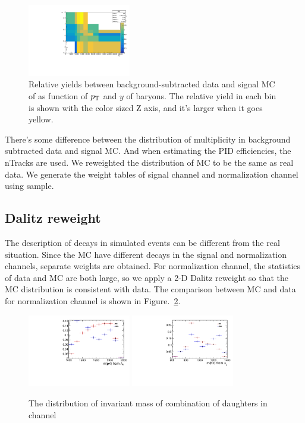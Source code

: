 \begin{figure}[bth]
\centering
\includegraphics[width=0.4\textwidth]{Figures/05_open_charm/04_tune/pt_y/ratio_pty.pdf}%
	\caption{ Relative yields between background-subtracted data and signal MC of \LbLcpi as function of $p_{\mathrm{T}}$ and $y$ of \Lb baryons. 
	The relative yield in each bin is shown with the color sized Z axis, and it's larger when it goes yellow.}
\label{Fig.pt_y_ratio}
\end{figure}

There's some difference between the distribution of multiplicity in background subtracted data and signal MC. 
And when estimating the PID efficiencies, the nTracks are used. 
We reweighted the distribution of MC to be the same as real data. 
We generate the weight tables of signal channel and normalization channel using \LbLcDs sample. 

\subsection{\Lc Dalitz reweight}
\label{sec:getdalitzweight}

The description of \Lc decays in simulated events can be different from the real situation. 
Since the MC have different \Lc decays in the signal and normalization channels, 
separate weights are obtained. 
For normalization channel, 
the statistics of data and MC are both large, 
so we apply a 2-D Dalitz reweight so that the MC distribution is consistent with data. 
The comparison between MC and data for normalization channel is shown in Figure.~\ref{Fig.dalitz_distri_pi}.

\begin{figure}[bth]
\centering
\includegraphics[width=0.4\textwidth]{Figures/05_open_charm/04_tune/dalitz/mkp.pdf}%
\includegraphics[width=0.4\textwidth]{Figures/05_open_charm/04_tune/dalitz/mkpi.pdf}%
\caption{ The distribution of invariant mass of combination of \Lc daughters in \LbLcDs channel}
\label{Fig.dalitz_distri_pi}
\end{figure}

